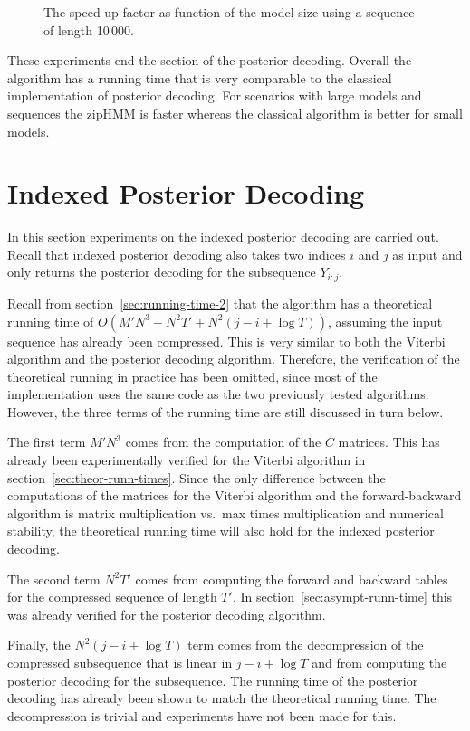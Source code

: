 \begin{figure}
  \centering
  
  \caption{The speed up factor as function of the model size using a sequence
    of length 10\,000.}
  \label{fig:posterior_speedup_vs_N}
\end{figure}

These experiments end the section of the posterior decoding. Overall the
algorithm has a running time that is very comparable to the classical
implementation of posterior decoding. For scenarios with large models and
sequences the zipHMM is faster whereas the classical algorithm is better
for small models.

\section{Indexed Posterior Decoding}

In this section experiments on the indexed posterior decoding are carried out.
Recall that indexed posterior decoding also takes two indices $i$ and $j$ as
input and only returns the posterior decoding for the subsequence $Y_{i:j}$.

Recall from section~\ref{sec:running-time-2} that the algorithm has a
theoretical running time of $O(M' N^3 + N^2 T' + N^2 (j - i + \log T))$,
assuming the input sequence has already been compressed. This is very similar
to both the Viterbi algorithm and the posterior decoding algorithm. Therefore,
the verification of the theoretical running in practice has been omitted, since
most of the implementation uses the same code as the two previously tested
algorithms. However, the three terms of the running time are still discussed in
turn below.

The first term $M' N^3$ comes from the computation of the $C$ matrices. This
has already been experimentally verified for the Viterbi algorithm in
section~\ref{sec:theor-runn-times}. Since the only difference between the
computations of the matrices for the Viterbi algorithm and the forward-backward
algorithm is matrix multiplication vs.\ max times multiplication and numerical
stability, the theoretical running time will also hold for the indexed posterior
decoding.

The second term $N^2 T'$ comes from computing the forward and backward tables
for the compressed sequence of length $T'$. In
section~\ref{sec:asympt-runn-time} this was already verified for the posterior
decoding algorithm.

Finally, the $N^2 (j - i + \log T)$ term comes from the decompression of the
compressed subsequence that is linear in $j - i + \log T$ and from computing
the posterior decoding for the subsequence. The running time of the posterior
decoding has already been shown to match the theoretical running time. The
decompression is trivial and experiments have not been
made for this. 

